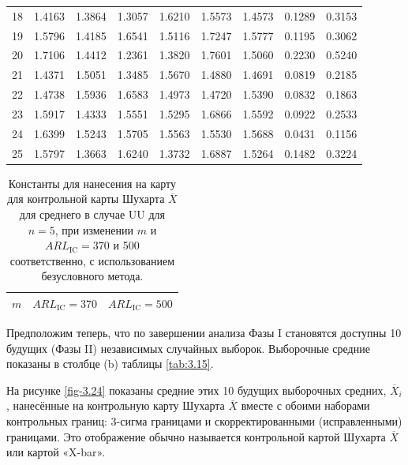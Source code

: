 \begin{table}[htbp]
\begin{tabular}{c *{5}{r} r r r}
		18 & 1.4163 & 1.3864 & 1.3057 & 1.6210 & 1.5573 & 1.4573 & 0.1289 & 0.3153 \\
		19 & 1.5796 & 1.4185 & 1.6541 & 1.5116 & 1.7247 & 1.5777 & 0.1195 & 0.3062 \\
		20 & 1.7106 & 1.4412 & 1.2361 & 1.3820 & 1.7601 & 1.5060 & 0.2230 & 0.5240 \\
		21 & 1.4371 & 1.5051 & 1.3485 & 1.5670 & 1.4880 & 1.4691 & 0.0819 & 0.2185 \\
		22 & 1.4738 & 1.5936 & 1.6583 & 1.4973 & 1.4720 & 1.5390 & 0.0832 & 0.1863 \\
		23 & 1.5917 & 1.4333 & 1.5551 & 1.5295 & 1.6866 & 1.5592 & 0.0922 & 0.2533 \\
		24 & 1.6399 & 1.5243 & 1.5705 & 1.5563 & 1.5530 & 1.5688 & 0.0431 & 0.1156 \\
		25 & 1.5797 & 1.3663 & 1.6240 & 1.3732 & 1.6887 & 1.5264 & 0.1482 & 0.3224 \\
		\bottomrule
	\end{tabular}
\end{table}

\begin{table}[htbp]
	\centering
	\caption{Константы для нанесения на карту для контрольной карты Шухарта \(\overline{X}\) для среднего в случае UU для \(n = 5\), при изменении \(m\) и \(ARL_{\text{IC}} = 370\) и 500 соответственно, с использованием безусловного метода.} %
	\label{tab:3.14}
	\begin{tabular}{ccc}
		\toprule
		\(m\) & \(ARL_{\text{IC}} = 370\) & \(ARL_{\text{IC}} = 500\) \\
		\midrule
		\bottomrule
	\end{tabular}
\end{table}

Предположим теперь, что по завершении анализа Фазы I становятся доступны 10 будущих (Фазы II) независимых случайных выборок. Выборочные средние показаны в столбце (b) таблицы \ref{tab:3.15}.

На рисунке \ref{fig-3.24} показаны средние этих 10 будущих выборочных средних, \(\overline{X}_i\), нанесённые на контрольную карту Шухарта \(\overline{X}\) вместе с обоими наборами контрольных границ: 3-сигма границами и скорректированными (исправленными) границами. Это отображение обычно называется контрольной картой Шухарта \(\overline{X}\) или картой «X-bar».

